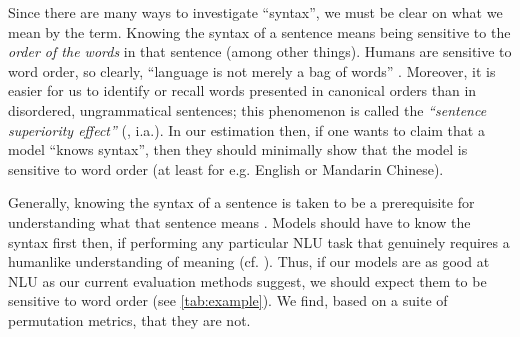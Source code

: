 \documentclass[11pt,a4paper]{article}
\begin{document}
Since there are many ways to investigate ``syntax'', we must be clear on what we mean by the term.  %
Knowing the syntax of a sentence means being sensitive to the \textit{order of the words} in that sentence (among other things).  Humans are sensitive to word order, so clearly, ``language is not merely a bag of words'' \citep[p.156]{harris-1954-distributional}.
Moreover, it is easier for us to identify or recall words presented in canonical orders than in disordered, ungrammatical sentences; this phenomenon is called the \textit{``sentence superiority effect''} (\citealt{cattell-1886-time, scheerer1981early, toyota-2001-changes, baddeley-etal-2009-working, snell-grainger-2017-sentence, snell2019word, wen-etal-2019-parallel}, i.a.).   %
In our estimation then, if one wants to claim that  a model ``knows syntax'', then they should minimally show that the model is sensitive to word order (at least for e.g. English or Mandarin Chinese).

Generally, knowing the syntax of a sentence is taken to be a prerequisite for understanding what that sentence means \citep{heim-kratzer-1998-semantics}.
Models should have to know the syntax first then, if performing any particular NLU task that genuinely requires a humanlike understanding of meaning (cf. \citealt{bender-koller-2020-climbing}). %
Thus, if our models are as good at NLU as our current evaluation methods suggest, we should expect them to be sensitive to word order (see \autoref{tab:example}).  We find, based on a suite of permutation metrics, that they are not.

\end{document}
